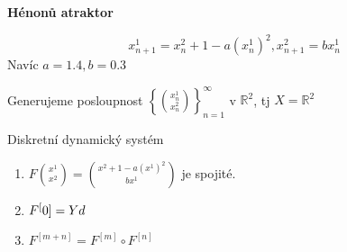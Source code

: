 \documentclass[../main.tex]{subfiles}
\begin{document}
\begin{example}
    \textbf{Hénonů atraktor}

    \begin{equation}
        x^1_{n+1} = x^2_n + 1 - a\left(x^1_n\right)^2, x^2_{n+1} = bx^1_n
    \end{equation}
    Navíc $a=1.4, b=0.3$

    Generujeme posloupnost $\left\{\binom{x_n^1}{x_n^2}\right\}_{n=1}^\infty$ v $\mathbb{R}^2$,
    tj $X = \mathbb{R}^2$

    Diskretní dynamický systém
    \begin{enumerate}
        \item $F\binom{x^1}{x^2} = \binom{  x^2 + 1 - a(x^1)^2 }{bx^1}$ je spojité.
        \item $F^[0] = Yd$
        \item $F^{[m+n]} = F^{[m]}\circ F^{[n]}$
    \end{enumerate}

\end{example}
\end{document}
